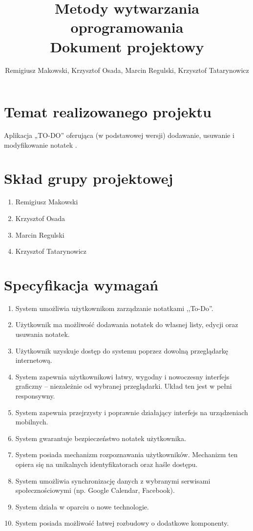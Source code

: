 \documentclass[a4paper,11pt]{article}
\author{Remigiusz Makowski, Krzysztof Osada, Marcin Regulski, Krzysztof Tatarynowicz}
\title{\textbf{\Huge{Metody wytwarzania oprogramowania}}\\[3pt] Dokument projektowy}
\begin{document}
  \singlespacing
    \maketitle\thispagestyle{empty}
  \onehalfspacing
  \section{Temat realizowanego projektu}
    Aplikacja „TO-DO” oferująca (w podstawowej wersji) dodawanie, usuwanie i modyfikowanie notatek .
  
  \section{Skład grupy projektowej}
  \begin{enumerate}
    \item Remigiusz Makowski 
    \item Krzysztof Osada 
    \item Marcin Regulski 
    \item Krzysztof Tatarynowicz 
  \end{enumerate}
    
  \section{Specyfikacja wymagań}
  \begin{enumerate}
    \item System umożliwia użytkownikom zarządzanie notatkami ,,To-Do''.
    \item Użytkownik ma możliwość dodawania notatek do własnej listy, edycji oraz usuwania notatek. 
    \item Użytkownik uzyskuje dostęp do systemu poprzez dowolną przeglądarkę internetową. 
    \item System zapewnia użytkownikowi łatwy, wygodny i nowoczesny interfejs graficzny -- niezależnie od wybranej przeglądarki. Układ ten jest w pełni responsywny. 
    \item System zapewnia przejrzysty i poprawnie działający interfejs na urządzeniach mobilnych. 
    \item System gwarantuje bezpieczeństwo notatek użytkownika. 
    \item System posiada mechanizm rozpoznawania użytkowników. Mechanizm ten opiera się na unikalnych identyfikatorach oraz haśle dostępu. 
    \item System umożliwia synchronizację danych z wybranymi serwisami społecznościowymi (np. Google Calendar, Facebook).
    \item System działa w oparciu o nowe technologie. 
    \item System posiada możliwość łatwej rozbudowy o dodatkowe komponenty.
  \end{enumerate}
\end{document}
